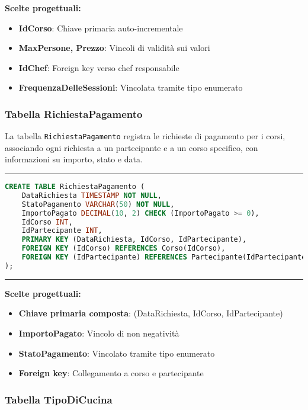 \textbf{Scelte progettuali:}
\begin{itemize}
    \item \textbf{IdCorso}: Chiave primaria auto-incrementale
    \item \textbf{MaxPersone, Prezzo}: Vincoli di validità sui valori
    \item \textbf{IdChef}: Foreign key verso chef responsabile
    \item \textbf{FrequenzaDelleSessioni}: Vincolata tramite tipo enumerato
\end{itemize}

\subsubsection{Tabella RichiestaPagamento}

La tabella \texttt{RichiestaPagamento} registra le richieste di pagamento per i corsi, associando ogni richiesta a un partecipante e a un corso specifico, con informazioni su importo, stato e data.

\noindent\rule{\textwidth}{0.4pt}
\begin{lstlisting}[language=SQL, style=sqlstyle]
CREATE TABLE RichiestaPagamento (
    DataRichiesta TIMESTAMP NOT NULL,
    StatoPagamento VARCHAR(50) NOT NULL,
    ImportoPagato DECIMAL(10, 2) CHECK (ImportoPagato >= 0),
    IdCorso INT,
    IdPartecipante INT,
    PRIMARY KEY (DataRichiesta, IdCorso, IdPartecipante),
    FOREIGN KEY (IdCorso) REFERENCES Corso(IdCorso),
    FOREIGN KEY (IdPartecipante) REFERENCES Partecipante(IdPartecipante)
);
\end{lstlisting}
\noindent\rule{\textwidth}{0.4pt}

\textbf{Scelte progettuali:}
\begin{itemize}
    \item \textbf{Chiave primaria composta}: (DataRichiesta, IdCorso, IdPartecipante)
    \item \textbf{ImportoPagato}: Vincolo di non negatività
    \item \textbf{StatoPagamento}: Vincolato tramite tipo enumerato
    \item \textbf{Foreign key}: Collegamento a corso e partecipante
\end{itemize}

\subsubsection{Tabella TipoDiCucina}

